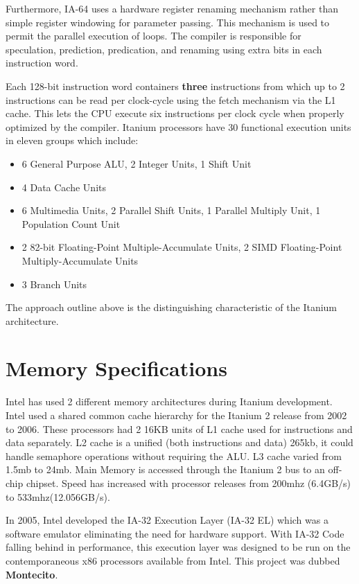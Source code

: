 \documentclass{article}
\begin{document}
Furthermore, IA-64 uses a hardware register renaming mechanism rather than simple register windowing for parameter passing. This mechanism is used to permit the parallel execution of loops. The compiler is responsible for speculation, prediction, predication, and renaming using extra bits in each instruction word.

Each 128-bit instruction word containers \textbf{three} instructions from which up to 2 instructions can be read per clock-cycle using the fetch mechanism via the L1 cache. This lets the CPU execute six instructions per clock cycle when properly optimized by the compiler. Itanium processors have 30 functional execution units in eleven groups which include:
\begin{itemize}
    \item 6 General Purpose ALU, 2 Integer Units, 1 Shift Unit
    \item 4 Data Cache Units
    \item 6 Multimedia Units, 2 Parallel Shift Units, 1 Parallel Multiply Unit, 1 Population Count Unit
    \item 2 82-bit Floating-Point Multiple-Accumulate Units, 2 SIMD Floating-Point Multiply-Accumulate Units
    \item 3 Branch Units
\end{itemize}
The approach outline above is the distinguishing characteristic of the Itanium architecture.

\section{Memory Specifications}
Intel has used 2 different memory architectures during Itanium development. Intel used a shared common cache hierarchy for the Itanium 2 release from 2002 to 2006. These processors had 2 16KB units of L1 cache used for instructions and data separately. L2 cache is a unified (both instructions and data) 265kb, it could handle semaphore operations without requiring the ALU. L3 cache varied from 1.5mb to 24mb. Main Memory is accessed through the Itanium 2 bus to an off-chip chipset. Speed has increased with processor releases from 200mhz (6.4GB/s) to 533mhz(12.056GB/s).

In 2005, Intel developed the IA-32 Execution Layer (IA-32 EL) which was a software emulator eliminating the need for hardware support. With IA-32 Code falling behind in performance, this execution layer was designed to be run on the contemporaneous x86 processors available from Intel. This project was dubbed \textbf{Montecito}.
\end{document}

